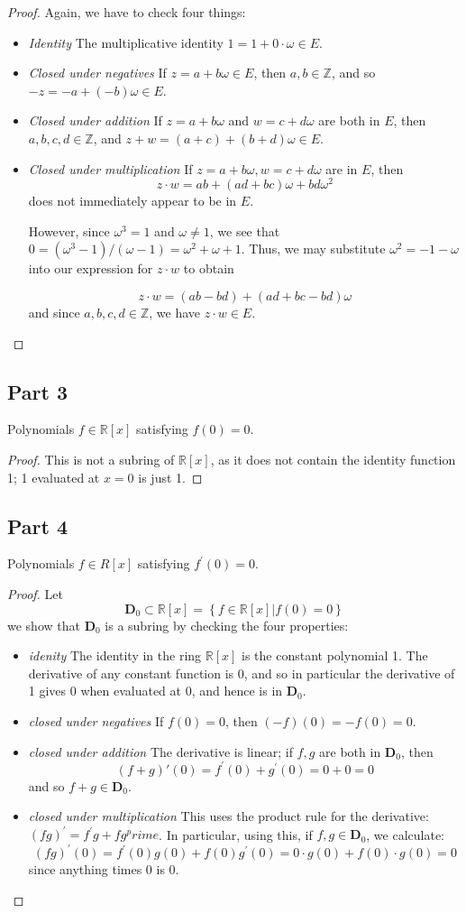 \documentclass{amsart}[12pt]
\newcommand{\Z}{\mathbb{Z}}
\newcommand{\R}{\mathbb{R}}
\begin{document}
\begin{proof}
Again, we have to check four things:
\begin{itemize}
\item \emph{Identity} The multiplicative identity $1=1+0\cdot\omega\in E$.
\item \emph{Closed under negatives} If $z=a+b\omega\in E$, then $a,b\in\Z$, and so $-z=-a+(-b)\omega\in E$.
\item \emph{Closed under addition} If $z=a+b\omega$ and $w=c+d\omega$ are both in $E$, then $a,b,c,d\in \Z$, and $z+w=(a+c)+(b+d)\omega\in E$.
\item \emph{Closed under multiplication} If $z=a+b\omega, w=c+d\omega$ are in $E$, then 
$$z\cdot w=ab+(ad+bc)\omega+bd\omega^2$$
 does not immediately appear to be in $E$.

However, since $\omega^3=1$ and $\omega\neq 1$, we see that $0=(\omega^3-1)/(\omega-1)=\omega^2+\omega+1$.  Thus, we may substitute $\omega^2=-1-\omega$ into our expression for $z\cdot w$ to obtain

$$z\cdot w=(ab-bd)+(ad+bc-bd)\omega$$
and since $a,b,c,d\in\Z$, we have $z\cdot w\in E$.
\end{itemize}
\end{proof}


\subsection*{Part 3} Polynomials $f\in\R[x]$ satisfying $f(0)=0$.
\begin{proof}
This is not a subring of $\R[x]$, as it does not contain the identity function 1; 1 evaluated at $x=0$ is just 1.
\end{proof}

\subsection*{Part 4} Polynomials $f\in R[x]$ satisfying $f^\prime(0)=0$.
\begin{proof}
Let $$\mathbf{D}_0\subset\R[x]=\left\{f\in\R[x] | f(0)=0\right\}$$
we show that $\mathbf{D}_0$ is a subring by checking the four properties:
\begin{itemize}
\item \emph{idenity} The identity in the ring $\R[x]$ is the constant polynomial 1.  The derivative of any constant function is 0, and so in particular the derivative of 1 gives 0 when evaluated at 0, and hence is in $\mathbf{D}_0$.
\item \emph{closed under negatives} If $f(0)=0$, then $(-f)(0)=-f(0)=0$.
\item \emph{closed under addition} The derivative is linear; if $f,g$ are both in $\mathbf{D}_0$, then 
$$(f+g)\prime(0)=f^\prime(0)+g^\prime(0)=0+0=0$$
and so $f+g\in\mathbf{D}_0$.
\item \emph{closed under multiplication} This uses the product rule for the derivative: $(fg)^\prime=f^\prime g+fg^prime$.  In particular, using this, if $f,g\in\mathbf{D}_0$, we calculate:
$$(fg)^\prime(0)=f^\prime(0)g(0)+f(0)g^\prime(0)=0\cdot g(0)+f(0)\cdot g(0)=0$$
since anything times 0 is 0.
\end{itemize}
\end{proof}
\end{document}
